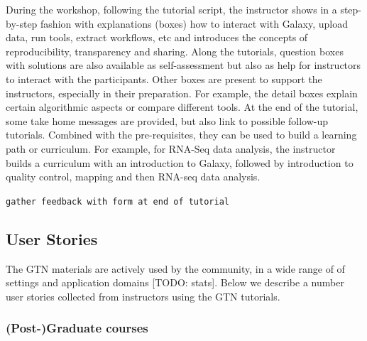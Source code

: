\documentclass[10pt,letterpaper]{article}
\begin{document}
During the workshop, following the tutorial script, the instructor shows in a step-by-step fashion with explanations (boxes) how to interact with Galaxy, upload data, run tools, extract workflows, etc and introduces the concepts of reproducibility, transparency and sharing. %
Along the tutorials, question boxes with solutions are also available as self-assessment but also as help for instructors to interact with the participants. Other boxes are present to support the instructors, especially in their preparation.
For example, the detail boxes explain certain algorithmic aspects or compare different tools.
At the end of the tutorial, some take home messages are provided, but also link to possible follow-up tutorials.
Combined with the pre-requisites, they can be used to build a learning path or curriculum.
For example, for RNA-Seq data analysis, the instructor builds a curriculum with an introduction to Galaxy, followed by introduction to quality control, mapping and then RNA-seq data analysis.

\verb+gather feedback with form at end of tutorial+

\subsection*{User Stories}

The GTN materials are actively used by the community, in a wide range of of settings and application domains [TODO: stats].
Below we describe a number user stories collected from instructors using the GTN tutorials.

\subsubsection*{(Post-)Graduate courses}
\end{document}

